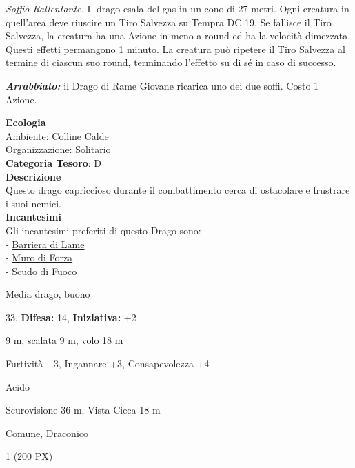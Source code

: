\begin{multicols}{2}
{\emph{Soffio Rallentante.} Il drago esala del gas in un cono di 27 metri. Ogni creatura in quell'area deve riuscire un Tiro Salvezza su Tempra DC 19. Se fallisce il Tiro Salvezza, la creatura ha una Azione in meno a round ed ha la velocità dimezzata. Questi effetti permangono 1 minuto. La creatura può ripetere il Tiro Salvezza al termine di ciascun suo round, terminando l'effetto su di sé in caso di successo.

\emph{\textbf{Arrabbiato:}} il Drago di Rame Giovane ricarica uno dei due soffi. Costo 1 Azione.

\textbf{Ecologia}\\
Ambiente: Colline Calde\\
Organizzazione: Solitario\\
\textbf{Categoria Tesoro}: D\\
\textbf{Descrizione}\\
Questo drago capriccioso durante il combattimento cerca di ostacolare e frustrare i suoi nemici.\\
\textbf{Incantesimi}\\
Gli incantesimi preferiti di questo Drago sono:\\
- \hyperlink{Barriera di Lame}{Barriera di Lame}\\
- \hyperlink{Muro di Forza}{Muro di Forza}\\
- \hyperlink{Scudo di Fuoco}{Scudo di Fuoco}

\noindent
\begin{description}[noitemsep, topsep=0pt, parsep=0pt, partopsep=0pt, leftmargin=0cm, labelwidth=2.2cm]
	\item[\textbf{Taglia/Tipo:}] Media drago, buono
	\item[\textbf{Caratt.:}] 
	\item[\textbf{Punti Ferita:}] 33,  \textbf{Difesa:} 14,  \textbf{Iniziativa:} +2
	\item[\textbf{Movimento:}] 9 m, scalata 9 m, volo 18 m
	\item[\textbf{Tiri Salvez.:}] 
	\item[\textbf{Comp.:}] Furtività +3, Ingannare +3, Consapevolezza +4
	\item[\textbf{Imm. Danni:}] Acido
	\item[\textbf{Sensi:}] Scurovisione 36 m, Vista Cieca 18 m
	\item[\textbf{Linguaggi:}] Comune, Draconico
	\item[\textbf{Sfida:}] 1 (200 PX)\smallskip
\end{description}

}
\end{multicols}
